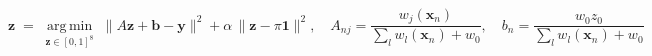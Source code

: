 

\begin{equation*}
\mathbf{z} \;=\; \operatorname*{arg\,min}_{\mathbf{z}\in[0,1]^8}\; \|A\mathbf{z} + \mathbf{b} - \mathbf{y}\|^2 + \alpha\,\|\mathbf{z} - \pi\mathbf{1}\|^2,
\quad A_{nj} = \frac{w_j(\mathbf{x}_n)}{\sum_l w_l(\mathbf{x}_n) + w_0},\quad b_n = \frac{w_0 z_0}{\sum_l w_l(\mathbf{x}_n) + w_0}
\tag{2}
\end{equation*}

